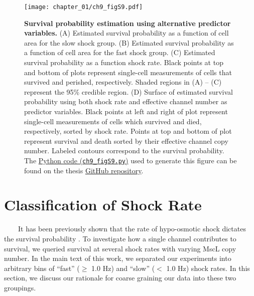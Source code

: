 \documentclass[12pt]{caltech_thesis}
\begin{document}
\hypertarget{fig:alternative_predictor_variables}{%
\begin{figure}
\centering
\texttt{[image: chapter\_01/ch9\_figS9.pdf]}
\caption[{Survival probability estimation using alternative predictor
variables.}]{\textbf{Survival probability estimation using alternative
predictor variables.} (A) Estimated survival probability as a function
of cell area for the slow shock group. (B) Estimated survival
probability as a function of cell area for the fast shock group. (C)
Estimated survival probability as a function shock rate. Black points at
top and bottom of plots represent single-cell measurements of cells that
survived and perished, respectively. Shaded regions in (A) -- (C)
represent the 95\% credible region. (D) Surface of estimated survival
probability using both shock rate and effective channel number as
predictor variables. Black points at left and right of plot represent
single-cell measurements of cells which survived and died, respectively,
sorted by shock rate. Points at top and bottom of plot represent
survival and death sorted by their effective channel copy number.
Labeled contours correspond to the survival probability. The
\href{https://github.com/gchure/phd/blob/master/src/chapter_09/code/ch9_figS9.py}{Python
code (\texttt{ch9\_figS9.py})} used to generate this figure can be found
on the thesis \href{https://github.com/gchure/phd}{GitHub repository}.}
\label{fig:alternative_predictor_variables}
\end{figure}
}

\hypertarget{classification-of-shock-rate}{%
\section{Classification of Shock
Rate}\label{classification-of-shock-rate}}

~~~~It has been previously shown that the rate of hypo-osmotic shock
dictates the survival probability \autocite{bialecka-fornal2015}. To
investigate how a single channel contributes to survival, we queried
survival at several shock rates with varying MscL copy number. In the
main text of this work, we separated our experiments into arbitrary bins
of ``fast'' (\(\geq\) 1.0 Hz) and ``slow'' (\(<\) 1.0 Hz) shock rates.
In this section, we discuss our rationale for coarse graining our data
into these two groupings.
\end{document}
